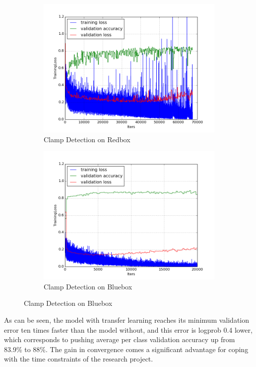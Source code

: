 \documentclass[a4paper,11pt]{article}
\begin{document}
\begin{figure}[h!]
	\centering
	\begin{subfigure}{.5\textwidth}
  		\centering
		\includegraphics[scale=0.4]{images/plot_clampdet_tl_wout.png}
		\caption{Clamp Detection on Redbox}
	\end{subfigure}%
	\begin{subfigure}{.5\textwidth}
  		\centering
		\includegraphics[scale=0.4]{images/plot_clampdet_none.png}
		\caption{Clamp Detection on Bluebox}
	\end{subfigure}
\end{figure}

As can be seen, the model with transfer learning reaches its minimum validation error ten times faster than the model without, and this error is logprob 0.4 lower, which corresponds to pushing average per class validation accuracy up from 83.9\% to 88\%. The gain in convergence comes a significant advantage for coping with the time constraints of the research project. 
\end{document}
